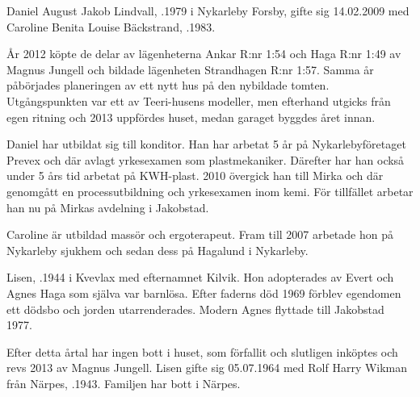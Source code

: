 


Daniel August Jakob Lindvall, .1979 i Nykarleby Forsby, gifte sig 14.02.2009 med Caroline Benita Louise Bäckstrand, .1983.

År 2012 köpte de delar av lägenheterna Ankar R:nr 1:54 och Haga R:nr 1:49 av Magnus Jungell och bildade lägenheten Strandhagen R:nr 1:57. Samma år påbörjades planeringen av ett nytt hus på den nybildade tomten. Utgångspunkten var ett av Teeri-husens modeller, men efterhand utgicks från egen ritning och 2013 uppfördes huset, medan garaget byggdes året innan.

Daniel har utbildat sig till konditor. Han har arbetat 5 år på Nykarlebyföretaget Prevex och där avlagt yrkesexamen som plastmekaniker. Därefter har han också under 5 års tid arbetat på KWH-plast. 2010 övergick han till Mirka  och där genomgått en processutbildning och yrkesexamen inom kemi. För tillfället arbetar han nu på Mirkas avdelning i Jakobstad.

Caroline är utbildad massör och ergoterapeut. Fram till 2007 arbetade hon på Nykarleby sjukhem och sedan dess på Hagalund i Nykarleby.

\begin{jhchildren}
  \item {}
  \item {}
\end{jhchildren}





Lisen, .1944 i Kvevlax med efternamnet Kilvik. Hon adopterades av Evert och Agnes Haga som själva var barnlösa. Efter faderns död 1969 förblev egendomen ett dödsbo och jorden utarrenderades. Modern Agnes flyttade till Jakobstad 1977.

Efter detta årtal har ingen bott i huset, som förfallit och slutligen inköptes och revs 2013 av Magnus Jungell. Lisen gifte sig 05.07.1964 med Rolf Harry Wikman från Närpes, .1943. Familjen har bott i Närpes.


